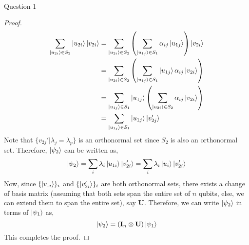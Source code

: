 \begin{solution}{Question 1}
\begin{proof}
        \begin{equation}
            \begin{split}
                \sum_{\ket{u_{2i}}\in S_2}\ket{u_{2i}}\ket{v_{2i}} &= \sum_{\ket{u_{2i}}\in S_2}\left(\sum_{\ket{u_{1j}}\in S_1}\alpha_{ij}\ket{u_{1j}}\right)\ket{v_{2i}}\\
                &= \sum_{\ket{u_{2i}}\in S_2}\left(\sum_{\ket{u_{1j}}\in S_1}\ket{u_{1j}}\alpha_{ij}\ket{v_{2i}}\right)\\
                &= \sum_{\ket{u_{1j}}\in S_1}\ket{u_{1j}}\left(\sum_{\ket{u_{2i}}\in S_2}\alpha_{ij}\ket{v_{2i}}\right)\\
                &= \sum_{\ket{u_{1j}}\in S_1}\ket{u_{1j}}\ket{v_{2j}'}
            \end{split}
        \end{equation}
        Note that $\{v_{2j}' | \lambda_j = \lambda_p\}$ is an orthonormal set since $S_2$ is also an orthonormal set. Therefore, $\ket{\psi_2}$ can be written as,
        \begin{equation}
            \ket{\psi_2} = \sum_i\lambda_i\ket{u_{1i}}\ket{v_{2i}'} = \sum_i\lambda_i\ket{u_i}\ket{v_{2i}'}
        \end{equation}
        Now, since $\{\ket{v_{1i}}\}_i$ and $\{\ket{v_{2i}'}\}_i$ are both orthonormal sets, there exists a change of basis matrix (assuming that both sets span the entire set of $n$ qubits, else, we can extend them to span the entire set), say $\mathbf{U}$. Therefore, we can write $\ket{\psi_2}$ in terms of $\ket{\psi_1}$ as,
        \begin{equation}
            \ket{\psi_2} = (\mathbf{I}_n\otimes \mathbf{U})\ket{\psi_1}
        \end{equation}
        This completes the proof.
    \end{proof}
\end{solution}

